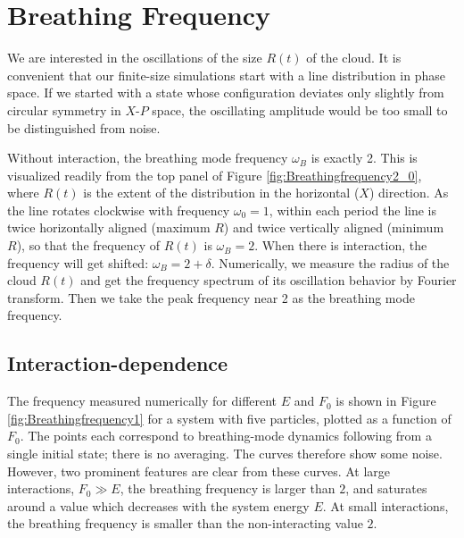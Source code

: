 \documentclass[a4paper, onecolumn]{revtex4-1}
\begin{document}
\section{Breathing Frequency}\label{sec:breathing}


We are interested in the oscillations of the size $R(t)$ of the cloud.  It is convenient that our
finite-size simulations start with a line distribution in phase space.  If we started with a state
whose configuration deviates only slightly from circular symmetry in $X$-$P$ space, the oscillating
amplitude would be too small to be distinguished from noise.

Without interaction, the breathing mode frequency $\omega_B$ is exactly 2.  This is visualized
readily from the top panel of Figure \ref{fig:Breathingfrequency2_0}, where $R(t)$ is the extent of
the distribution in the horizontal ($X$) direction.  As the line rotates clockwise with frequency
$\omega_0=1$, within each period the line is twice horizontally aligned (maximum $R$) and twice
vertically aligned (minimum $R$), so that the frequency of $R(t)$ is $\omega_B=2$.  When there is
interaction, the frequency will get shifted: $\omega_B = 2+\delta$.  Numerically, we measure the
radius of the cloud $R(t)$ and get the frequency spectrum of its oscillation behavior by Fourier
transform. Then we take the peak frequency near 2 as the breathing mode frequency.


\subsection{Interaction-dependence}

The frequency measured numerically for different $E$ and $F_0$ is shown in Figure
\ref{fig:Breathingfrequency1} for a system with five particles, plotted as a function of $F_0$.  The
points each correspond to breathing-mode dynamics following from a single initial state; there is no
averaging.  The curves therefore show some noise.  However, two prominent features are clear from
these curves.  At large interactions, $F_0\gg E$, the breathing frequency is larger than $2$, and
saturates around a value which decreases with the system energy $E$.  At small interactions, the
breathing frequency is smaller than the non-interacting value $2$.
\end{document}
